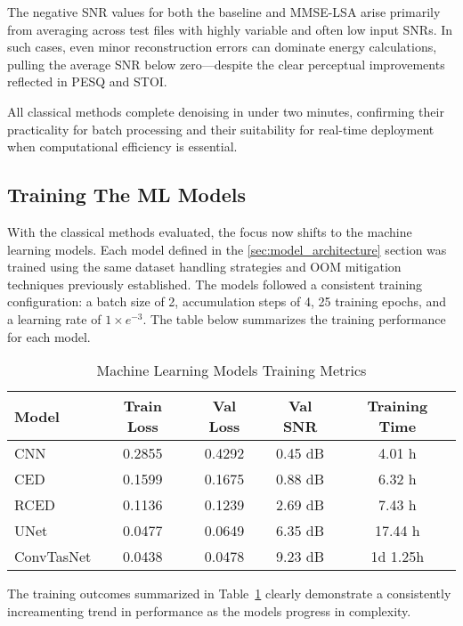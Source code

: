The negative SNR values for both the baseline and MMSE-LSA arise primarily from averaging across test files with highly variable and often low input SNRs. In such cases, even minor reconstruction errors can dominate energy calculations, pulling the average SNR below zero—despite the clear perceptual improvements reflected in PESQ and STOI.

All classical methods complete denoising in under two minutes, confirming their practicality for batch processing and their suitability for real-time deployment when computational efficiency is essential.

\subsection{Training The ML Models}
\label{sec:training_ml_models}

With the classical methods evaluated, the focus now shifts to the machine learning models. Each model defined in the \ref{sec:model_architecture} section was trained using the same dataset handling strategies and OOM mitigation techniques previously established. The models followed a consistent training configuration: a batch size of 2, accumulation steps of 4, 25 training epochs, and a learning rate of $1 \times e^{-3}$. The table below summarizes the training performance for each model.

\vspace{1em}
\begin{table}[H]
\centering
\caption{Machine Learning Models Training Metrics}
\label{tab:ml_training}
\begin{tabular}{|l|c|c|c|c|}
\hline
\textbf{Model} & \textbf{Train Loss} & \textbf{Val Loss} & \textbf{Val SNR} & \textbf{Training Time} \\
\hline
CNN         & 0.2855 & 0.4292 & 0.45 dB & 4.01 h \\
CED         & 0.1599 & 0.1675 & 0.88 dB & 6.32 h \\
RCED        & 0.1136 & 0.1239 & 2.69 dB & 7.43 h \\
UNet        & 0.0477 & 0.0649 & 6.35 dB & 17.44 h \\
ConvTasNet  & 0.0438 & 0.0478 & 9.23 dB & 1d 1.25h \\
\hline
\end{tabular}
\end{table}

The training outcomes summarized in Table~\ref{tab:ml_training} clearly demonstrate a consistently increamenting trend in performance as the models progress in complexity. 

